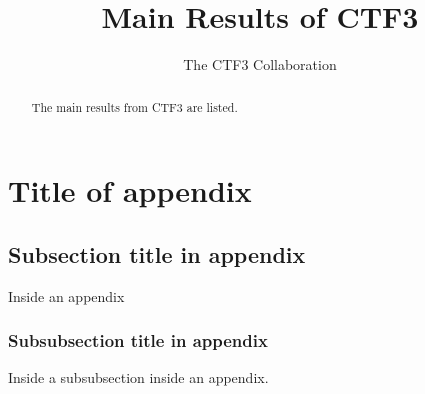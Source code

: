 \documentclass{cernrep}
\begin{document}
\title{Main Results of CTF3}

\author{The CTF3 Collaboration}


\begin{abstract}
The main results from CTF3 are listed.
\end{abstract}


\maketitle






\appendix
\section{Title of appendix}
\label{sec:app}

\subsection{Subsection title in appendix}
Inside an appendix
\subsubsection{Subsubsection title in appendix}
Inside a subsubsection inside an appendix.

\end{document}

